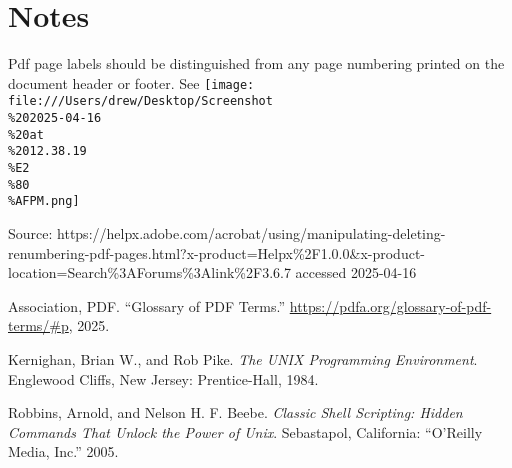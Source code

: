 \documentclass[
  letterpaper,
]{tufte-handout}
\newlength{\cslhangindent}
\newenvironment{CSLReferences}[2] %
 {\begin{list}{}{%
  \setlength{\itemindent}{0pt}
  \setlength{\leftmargin}{0pt}
  \setlength{\parsep}{0pt}
  \ifodd #1
   \setlength{\leftmargin}{\cslhangindent}
   \setlength{\itemindent}{-1\cslhangindent}
  \fi
  \setlength{\itemsep}{#2\baselineskip}}}
 {\end{list}}
\begin{document}
\section{Notes}\label{notes}

Pdf page labels should be distinguished from any page numbering printed
on the document header or footer. See
\texttt{[image: file:///Users/drew/Desktop/Screenshot\\\%202025-04-16\\\%20at\\\%2012.38.19\\\%E2\\\%80\\\%AFPM.png]}

Source:
https://helpx.adobe.com/acrobat/using/manipulating-deleting-renumbering-pdf-pages.html?x-product=Helpx\%2F1.0.0\&x-product-location=Search\%3AForums\%3Alink\%2F3.6.7
accessed 2025-04-16

\label{refs}
\begin{CSLReferences}{1}{0}
Association, PDF. {``Glossary of PDF Terms.''}
\url{https://pdfa.org/glossary-of-pdf-terms/\#p}, 2025.

Kernighan, Brian W., and Rob Pike. \emph{The UNIX Programming
Environment}. Englewood Cliffs, New Jersey: Prentice-Hall, 1984.

Robbins, Arnold, and Nelson H. F. Beebe. \emph{Classic Shell Scripting:
Hidden Commands That Unlock the Power of Unix}. Sebastapol, California:
{``O'Reilly Media, Inc.''} 2005.

\end{CSLReferences}
\end{document}
